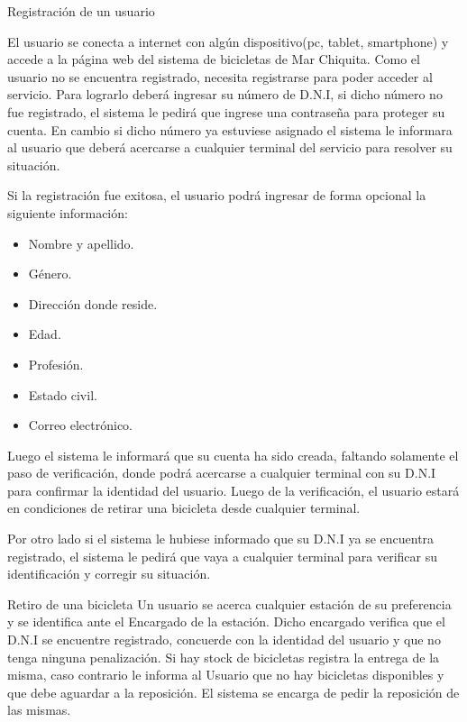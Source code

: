 
\begin{subsection}{Registración de un usuario}

El usuario se conecta a internet con algún dispositivo(pc, tablet, smartphone) y accede a la página
web del sistema de bicicletas de Mar Chiquita. Como el usuario no se encuentra registrado, necesita 
registrarse para poder acceder al servicio. Para lograrlo deberá ingresar su número de D.N.I, si dicho
número no fue registrado, el sistema le pedirá que ingrese una contraseña para proteger su cuenta. En cambio
si dicho número ya estuviese asignado el sistema le informara al usuario que deberá acercarse a cualquier
terminal del servicio para resolver su situación.

Si la registración fue exitosa, el usuario podrá ingresar de forma opcional la siguiente información:
	\begin{itemize}
	\item Nombre y apellido.
	\item Género.
	\item Dirección donde reside.
	\item Edad.
	\item Profesión.
	\item Estado civil.
	\item Correo electrónico.
	\end{itemize}

Luego el sistema le informará que su cuenta ha sido creada, faltando solamente el paso de verificación, donde
podrá acercarse a cualquier terminal con su D.N.I para confirmar la identidad del usuario. Luego de la 
verificación, el usuario estará en condiciones de retirar una bicicleta desde cualquier terminal.

Por otro lado si el sistema le hubiese informado que su D.N.I ya se encuentra registrado, el sistema le pedirá
que vaya a cualquier terminal para verificar su identificación y corregir su situación.
\end{subsection} 

\begin{subsection}{Retiro de una bicicleta}
Un usuario se acerca cualquier estación de su preferencia y se identifica ante el Encargado de la estación.
Dicho encargado verifica que el D.N.I se encuentre registrado, concuerde con la identidad del usuario y que no tenga ninguna penalización. Si hay stock de bicicletas registra la entrega de la misma, caso contrario le informa al Usuario que no hay bicicletas disponibles y que debe aguardar a la reposición. El sistema se encarga de pedir la reposición de las mismas.

\end{subsection} 

